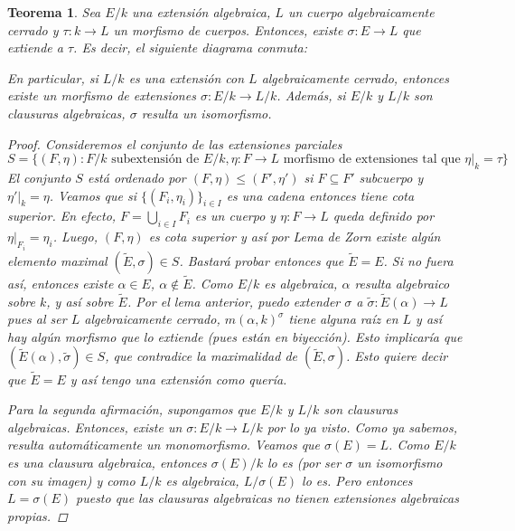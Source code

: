 \documentclass[12pt]{book}
\newtheorem{teo}{Teorema}[section]
\theoremstyle{definition}
\begin{document}
\begin{teo}
Sea $E/k$ una extensión algebraica, $L$ un cuerpo algebraicamente cerrado y $\tau:k\to L$ un morfismo de cuerpos. Entonces, existe $\sigma:E\to L$ que extiende a $\tau$. Es decir, el siguiente diagrama conmuta: \begin{center}
\end{center}
En particular, si $L/k$ es una extensión con $L$ algebraicamente cerrado, entonces existe un morfismo de extensiones $\sigma:E/k\to L/k$. 
Además, si $E/k$ y $L/k$ son clausuras algebraicas, $\sigma$ resulta un isomorfismo.
\begin{proof}
Consideremos el conjunto de las extensiones parciales $$S=\{(F,\eta) : F/k \text{ subextensión de }E/k, \eta:F\to L \text{ morfismo de extensiones tal que }\left.\eta\right|_{k}=\tau\}$$ El conjunto $S$ está ordenado por $(F,\eta)\leq (F',\eta')$ si $F\subseteq F'$ subcuerpo y $\left.\eta'\right|_{k} = \eta$. Veamos que si $\{(F_i,\eta_i)\}_{i\in I}$ es una cadena entonces tiene cota superior. En efecto, $F=\displaystyle\bigcup_{i\in I} F_i$ es un cuerpo y $\eta:F\to L$ queda definido por $\left.\eta\right|_{F_i}=\eta_i$. Luego, $(F,\eta)$ es cota superior y así por Lema de Zorn existe algún elemento maximal $(\tilde{E},\sigma)\in S$. Bastará probar entonces que $\tilde{E}=E$. Si no fuera así, entonces existe $\alpha\in E$, $\alpha\notin \tilde{E}$. Como $E/k$ es algebraica, $\alpha$ resulta algebraico sobre $k$, y así sobre $\tilde{E}$. Por el lema anterior, puedo extender $\sigma$ a $\tilde{\sigma}:\tilde{E}(\alpha)\to L$ pues al ser $L$ algebraicamente cerrado, $m(\alpha,k)^\sigma$ tiene alguna raíz en $L$ y así hay algún morfismo que lo extiende (pues están en biyección). Esto implicaría que $(\tilde{E}(\alpha),\tilde{\sigma})\in S$, que contradice la maximalidad de $(\tilde{E},\sigma)$. Esto quiere decir que $\tilde{E}=E$ y así tengo una extensión como quería.

Para la segunda afirmación, supongamos que $E/k$ y $L/k$ son clausuras algebraicas. Entonces, existe un $\sigma:E/k\to L/k$ por lo ya visto. Como ya sabemos, resulta automáticamente un monomorfismo. Veamos que $\sigma(E)=L$. Como $E/k$ es una clausura algebraica, entonces $\sigma(E)/k$ lo es (por ser $\sigma$ un isomorfismo con su imagen) y como $L/k$ es algebraica, $L/\sigma(E)$ lo es. Pero entonces $L=\sigma(E)$ puesto que las clausuras algebraicas no tienen extensiones algebraicas propias.
\end{proof}
\end{teo}
\end{document}
